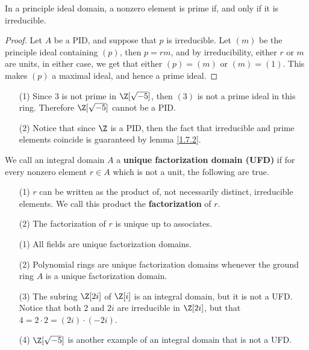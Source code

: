\begin{lemma}\label{1.7.2}
    In a principle ideal domain, a nonzero element is prime if, and only if it
    is irreducible.
\end{lemma}
\begin{proof}
    Let $A$ be a PID, and suppose that $p$ is irreducible. Let $(m)$ be the
    principle ideal containing $(p)$, then $p=rm$, and by irreducibility, either
     $r$ or $m$ are units, in either case, we get that either $(p)=(m)$ or
     $(m)=(1)$. This makes $(p)$ a maximal ideal, and hence a prime ideal.
\end{proof}

\begin{example}\label{2.7}
    \begin{enumerate}
        \item[(1)] Since $3$ is not prime in  $\Z[\sqrt{-5}]$, then $(3)$ is not
            a prime ideal in this ring. Therefore $\Z[\sqrt{-5}]$ cannot be a
            PID.

        \item[(2)] Notice that since $\Z$ is a PID, then the fact that
            irreducible and prime elements coincide is guaranteed by lemma
            \ref{1.7.2}.
    \end{enumerate}
\end{example}

\begin{definition}
    We call an integral domain $A$ a  \textbf{unique factorization domain (UFD)}
    if for every nonzero element $r \in A$ which is not a unit, the following
    are true.
    \begin{enumerate}
        \item[(1)] $r$ can be written as the product of, not necessarily distinct,
            irreducible elements. We call this product the
            \textbf{factorization} of $r$.

        \item[(2)] The factorization of $r$ is unique up to associates.
    \end{enumerate}
\end{definition}

\begin{example}\label{2.8}
    \begin{enumerate}
        \item[(1)] All fields are unique factorization domains.

        \item[(2)] Polynomial rings are unique factorization domains whenever
            the ground ring $A$ is a unique factorization domain.

        \item[(3)] The subring $\Z[2i]$ of $\Z[i]$ is an integral domain, but it
            is not a UFD. Notice that both $2$ and  $2i$ are irreducible in
            $\Z[2i]$, but that $4=2 \cdot 2=(2i) \cdot (-2i)$.

        \item[(4)] $\Z[\sqrt{-5}]$ is another example of an integral domain that
            is not a UFD.
    \end{enumerate}
\end{example}

